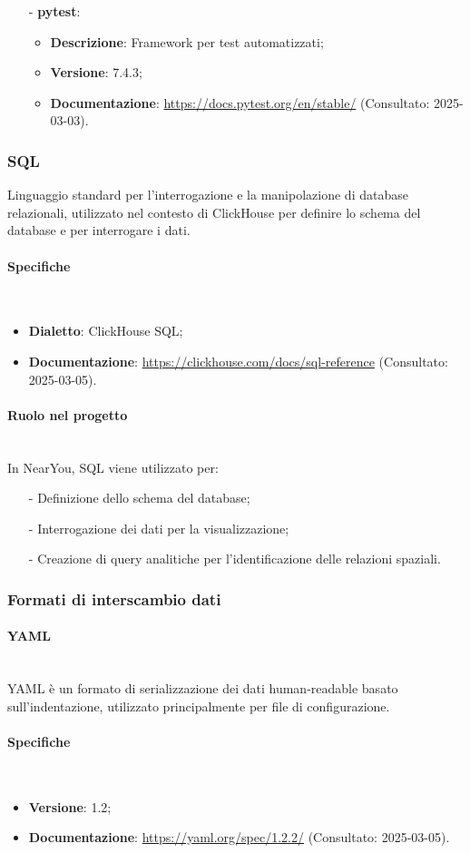 \documentclass[10pt]{article}
\newcommand{\myparagraph}[1]{\paragraph{#1}\mbox{}\\}
\begin{document}
\begin{itemize}
    \item[-] \textbf{pytest}:
    \begin{itemize}
        \item \textbf{Descrizione}: Framework per test automatizzati;
        \item \textbf{Versione}: 7.4.3;
        \item \textbf{Documentazione}: \textcolor{blue}{\url{https://docs.pytest.org/en/stable/}} (Consultato: 2025-03-03).
    \end{itemize}
\end{itemize}

\subsubsection{SQL}
Linguaggio standard per l'interrogazione e la manipolazione di database relazionali, utilizzato nel contesto di ClickHouse per definire lo schema del database e per interrogare i dati.

\myparagraph{Specifiche}
\begin{itemize}
    \item \textbf{Dialetto}: ClickHouse SQL;
    \item \textbf{Documentazione}: \textcolor{blue}{\url{https://clickhouse.com/docs/sql-reference}} (Consultato: 2025-03-05).
\end{itemize}

\myparagraph{Ruolo nel progetto}
In NearYou, SQL viene utilizzato per:
\begin{itemize}
    \item[-] Definizione dello schema del database;
    \item[-] Interrogazione dei dati per la visualizzazione;
    \item[-] Creazione di query analitiche per l'identificazione delle relazioni spaziali.
\end{itemize}

\subsubsection{Formati di interscambio dati}
\myparagraph{YAML}
YAML è un formato di serializzazione dei dati human-readable basato sull'indentazione, utilizzato principalmente per file di configurazione.

\myparagraph{Specifiche}
\begin{itemize}
    \item \textbf{Versione}: 1.2;
    \item \textbf{Documentazione}: \textcolor{blue}{\url{https://yaml.org/spec/1.2.2/}} (Consultato: 2025-03-05).
\end{itemize}
\end{document}
